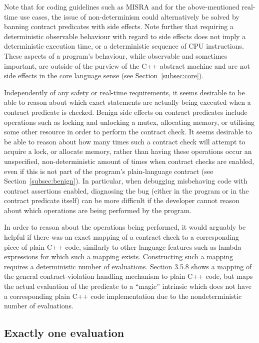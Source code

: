 Note that for coding guidelines such as MISRA and for the above-mentioned real-time use cases, the issue of non-determinism could alternatively be solved by banning contract predicates with side effects. Note further that requiring a deterministic observable behaviour with regard to side effects does not imply a deterministic execution time, or a deterministic sequence of CPU instructions. These aspects of a program's behaviour, while observable and sometimes important, are outside of the purview of the C++ abstract machine and are not side effects in the core language sense (see Section~\ref{subsec:core}).

Independently of any safety or real-time requirements, it seems desirable to be able to reason about which exact statements are actually being executed when a contract predicate is checked. Benign side effects on contract predicates include operations such as locking and unlocking a mutex, allocating memory, or utilising some other resource in order to perform the contract check. It seems desirable to be able to reason about how many times such a contract check will attempt to acquire a lock, or allocate memory, rather than having these operations occur an unspecified, non-deterministic amount of times when contract checks are enabled, even if this is not part of the program's plain-language contract (see Section~\ref{subsec:benign}). In particular, when debugging misbehaving code with contract assertions enabled, diagnosing the bug (either in the program or in the contract predicate itself) can be more difficult if the developer cannot reason about which operations are being performed by the program.

In order to reason about the operations being performed, it would arguably be helpful if there was an exact mapping of a contract check to a corresponding piece of plain C++ code, similarly to other language features such as lambda expressions for which such a mapping exists. Constructing such a mapping requires a deterministic number of evaluations. \cite{P2900R6} Section 3.5.8 shows a mapping of the general contract-violation handling mechanism to plain C++ code, but maps the actual evaluation of the predicate \emph{} to a ``magic'' intrinsic \emph{}\tcode{)} which does not have a corresponding plain C++ code implementation due to the nondeterministic number of evaluations. %

\subsection{Exactly one evaluation}
\label{subsec:exactlyonce}


